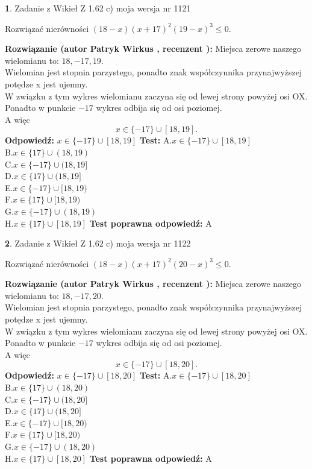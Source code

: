 \documentclass[12pt, a4paper]{article}
\theoremstyle{definition} %
\newtheorem{zad}{}
\newcommand{\zadStart}[1]{\begin{zad}#1\newline}
\newcommand{\zadStop}{\end{zad}}
\newcommand{\rozwStart}[2]{\noindent \textbf{Rozwiązanie (autor #1 , recenzent #2): }\newline}
\newcommand{\rozwStop}{\newline}
\newcommand{\odpStart}{\noindent \textbf{Odpowiedź:}\newline}
\newcommand{\odpStop}{\newline}
\newcommand{\testStart}{\noindent \textbf{Test:}\newline}
\newcommand{\testStop}{\newline}
\newcommand{\kluczStart}{\noindent \textbf{Test poprawna odpowiedź:}\newline}
\newcommand{\kluczStop}{\newline}
\begin{document}
\zadStart{Zadanie z Wikieł Z 1.62 c) moja wersja nr 1121}

Rozwiązać nierówności $(18-x)(x+17)^{2}(19-x)^{3}\le0$.
\zadStop
\rozwStart{Patryk Wirkus}{}
Miejsca zerowe naszego wielomianu to: $18, -17, 19$.\\
Wielomian jest stopnia parzystego, ponadto znak współczynnika przy\linebreak najwyższej potędze x jest ujemny.\\ W związku z tym wykres wielomianu zaczyna się od lewej strony powyżej osi OX.\\
Ponadto w punkcie $-17$ wykres odbija się od osi poziomej.\\
A więc $$x \in \{-17\} \cup [18,19].$$
\rozwStop
\odpStart
$x \in \{-17\} \cup [18,19]$
\odpStop
\testStart
A.$x \in \{-17\} \cup [18,19]$\\
B.$x \in \{17\} \cup (18,19)$\\
C.$x \in \{-17\} \cup (18,19]$\\
D.$x \in \{17\} \cup (18,19]$\\
E.$x \in \{-17\} \cup [18,19)$\\
F.$x \in \{17\} \cup [18,19)$\\
G.$x \in \{-17\} \cup (18,19)$\\
H.$x \in \{17\} \cup [18,19]$
\testStop
\kluczStart
A
\kluczStop



\zadStart{Zadanie z Wikieł Z 1.62 c) moja wersja nr 1122}

Rozwiązać nierówności $(18-x)(x+17)^{2}(20-x)^{3}\le0$.
\zadStop
\rozwStart{Patryk Wirkus}{}
Miejsca zerowe naszego wielomianu to: $18, -17, 20$.\\
Wielomian jest stopnia parzystego, ponadto znak współczynnika przy\linebreak najwyższej potędze x jest ujemny.\\ W związku z tym wykres wielomianu zaczyna się od lewej strony powyżej osi OX.\\
Ponadto w punkcie $-17$ wykres odbija się od osi poziomej.\\
A więc $$x \in \{-17\} \cup [18,20].$$
\rozwStop
\odpStart
$x \in \{-17\} \cup [18,20]$
\odpStop
\testStart
A.$x \in \{-17\} \cup [18,20]$\\
B.$x \in \{17\} \cup (18,20)$\\
C.$x \in \{-17\} \cup (18,20]$\\
D.$x \in \{17\} \cup (18,20]$\\
E.$x \in \{-17\} \cup [18,20)$\\
F.$x \in \{17\} \cup [18,20)$\\
G.$x \in \{-17\} \cup (18,20)$\\
H.$x \in \{17\} \cup [18,20]$
\testStop
\kluczStart
A
\kluczStop
\end{document}
